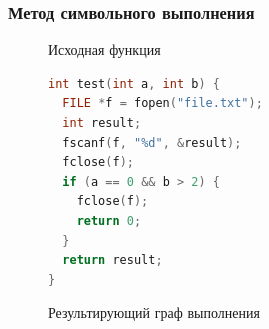 \documentclass[hyperref={pdfpagelabels=false},10pt]{beamer}
\begin{document}
\begin{frame}[fragile]

\frametitle{Метод символьного выполнения}
\begin{figure}[h]
  \begin{minipage}[h]{0.4\linewidth}
  Исходная функция
\begin{lstlisting}[language=C++,basicstyle=\tiny]
int test(int a, int b) {
  FILE *f = fopen("file.txt");
  int result;
  fscanf(f, "%d", &result);
  fclose(f);
  if (a == 0 && b > 2) {
    fclose(f);
    return 0;
  }
  return result;
}
\end{lstlisting}
  \end{minipage}
  \hfill
  \begin{minipage}[h]{0.58\linewidth}
    Результирующий граф выполнения
  \end{minipage}
\end{figure}
\end{frame}
\end{document}
